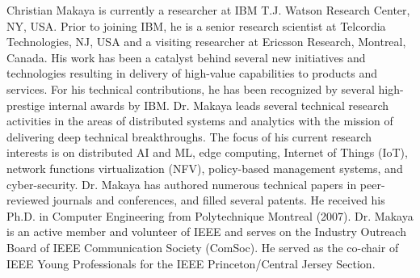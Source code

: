 \documentclass[10pt,journal,compsoc]{IEEEtran}
\begin{document}
\begin{IEEEbiography}
{Christian Makaya}
is currently a researcher at IBM T.J. Watson Research Center, NY, USA. Prior to joining IBM, he is a senior research scientist at Telcordia Technologies, NJ, USA and a visiting researcher at Ericsson Research, Montreal, Canada. His work has been a catalyst behind several new initiatives and technologies resulting in delivery of high-value capabilities to products and services. For his technical contributions, he has been recognized by several high-prestige internal awards by IBM. Dr. Makaya leads several technical research activities in the areas of distributed systems and analytics with the mission of delivering deep technical breakthroughs. The focus of his current research interests is on distributed AI and ML, edge computing, Internet of Things (IoT), network functions virtualization (NFV), policy-based management systems, and cyber-security. Dr. Makaya has authored numerous technical papers in peer-reviewed journals and conferences, and filled several patents. He received his Ph.D. in Computer Engineering from Polytechnique Montreal (2007). Dr. Makaya is an active member and volunteer of IEEE and serves on the Industry Outreach Board of IEEE Communication Society (ComSoc). He served as the co-chair of IEEE Young Professionals for the IEEE Princeton/Central Jersey Section.
\end{IEEEbiography}










\end{document}
